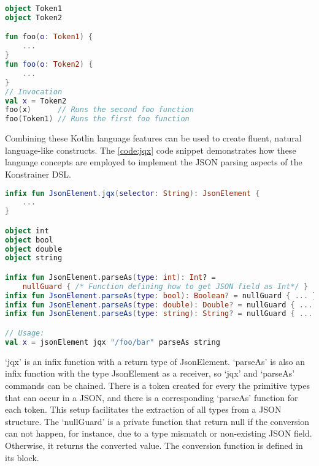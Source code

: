 \begin{lstlisting}[caption={Pattern matching},language=Kotlin,label=code:patternobj]
object Token1
object Token2

fun foo(o: Token1) {
    ...
}
fun foo(o: Token2) {
    ...
}
// Invocation
val x = Token2
foo(x)      // Runs the second foo function
foo(Token1) // Runs the first foo function
\end{lstlisting}

Combining these Kotlin language features can be used to create fluent, natural language-like constructs. The \ref{code:jqx} code snippet demonstrates how these language concepts are employed to implement the JSON parsing aspects of the Konstrainer DSL.

\begin{lstlisting}[caption={jqx implementation},language=Kotlin,label=code:jqx]
infix fun JsonElement.jqx(selector: String): JsonElement {
    ...
}

object int
object bool
object double
object string

infix fun JsonElement.parseAs(type: int): Int? = 
    nullGuard { /* Function defining how to get JSON field as Int*/ }
infix fun JsonElement.parseAs(type: bool): Boolean? = nullGuard { ... }
infix fun JsonElement.parseAs(type: double): Double? = nullGuard { ... }
infix fun JsonElement.parseAs(type: string): String? = nullGuard { ... }

// Usage:
val x = jsonElement jqx "/foo/bar" parseAs string
\end{lstlisting}

`jqx' is an infix function with a return type of JsonElement. `parseAs' is also an infix function with the type JsonElement as a receiver, so `jqx' and `parseAs' commands can be chained. There is a token created for every the primitive types that can occur in a JSON, and there is a corresponding `parseAs' function for each token. This setup facilitates the extraction of all types from a JSON structure. The `nullGuard' is a private function that return null if the conversion can not happen, for instance, due to a type mismatch or non-existing JSON field. Otherwise, it returns the converted value. The conversion function is defined in its block.
